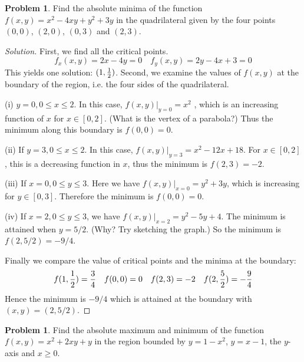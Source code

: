 \documentclass[12pt]{amsart}%
\theoremstyle{plain}
\theoremstyle{definition}
\newtheorem{prob}[theorem]{Problem}
\theoremstyle{special}
\newcommand{\sol}[1]{
{\begin{proof}[Solution]#1\end{proof}}
}
\newcommand{\Prob}[1]{\begin{tcolorbox}%
\begin{prob}
	#1
\end{prob}
\end{tcolorbox}	
}
\begin{document}
\Prob{Find the absolute minima of the function $f(x,y)=x^2-4xy+y^2+3y$ in the quadrilateral given by the four points $(0,0)$, $(2,0)$, $(0,3)$ and $(2,3)$.}
\sol{First, we find all the critical points.
\[f_x(x,y)=2x-4y=0\quad f_y(x,y)=2y-4x+3=0\]
This yields one solution: $(1,{1\over 2})$. Second, we examine the values of $f(x,y)$ at the boundary of the region, i.e. the four sides of the quadrilateral.

(i) $y=0,0\leq x\leq 2$. In this case, $f(x,y)|_{y=0}=x^2$
, which is an increasing function of $x$ for $x\in[0,2]$. (What is the vertex of a parabola?) Thus the minimum along this boundary is $f(0,0)=0$.

(ii) If $y=3,0\leq x\leq 2$. In this case, $f(x,y)|_{y=3}=x^2-12x+18$. For $x\in[0,2]$, this is a decreasing function in $x$, thus the minimum is $f(2,3)= -2$.

(iii) If $x=0, 0\leq y\leq 3$. Here we have $f(x,y)|_{x=0}=y^2+3y$, which is increasing for $y\in[0,3]$. Therefore the minimum is $ f(0,0)=0$.

(iv) If $x=2, 0\leq y\leq 3$, we have $f(x,y)|_{x=2}=y^2-5y+4$. The minimum is attained when $y= 5/2$. (Why? Try sketching the graph.) So the minimum is $f(2,5/2)=-9/4$.

Finally we compare the value of critical points and the minima at the boundary:
\[f(1,{1\over 2})= {3\over 4}\quad f(0,0)=0\quad f(2,3)=-2\quad f(2,{5\over 2})=-{9\over 4}\]
Hence the minimum is $-9/4$ which is attained at the boundary with $(x,y)=(2,5/2)$.
}
\Prob{Find the absolute maximum and minimum of the function $f(x,y)=x^2+2xy+y$ in the region bounded by $y=1-x^2$, $y=x-1$, the $y$-axis and $x\geq 0$.}
\newpage
\end{document}
